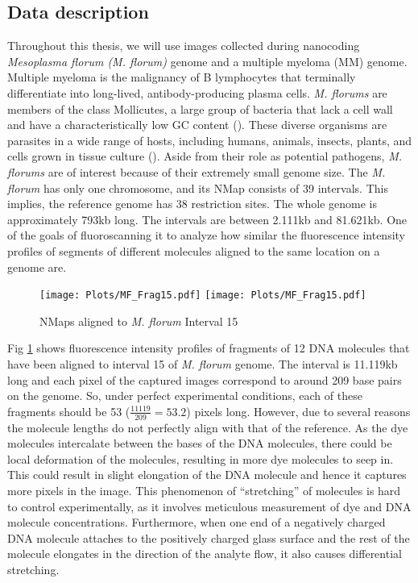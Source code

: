 \subsection{Data description} \label{Ch2_data}
Throughout this thesis, we will use images collected during nanocoding {\emph{Mesoplasma florum (M. florum)}} genome and a multiple myeloma (MM) genome. Multiple myeloma is the malignancy of B lymphocytes
that terminally differentiate into long-lived, antibody-producing plasma cells. {\emph{M. florums}} are members of the class Mollicutes, a large group of bacteria that lack a cell wall and have a characteristically low GC content (\cite{Razin_etal_1998_MMBR}). These diverse organisms are parasites in a wide range of hosts, including humans, animals, insects, plants, and cells grown in tissue culture (\cite{Razin_etal_1998_MMBR}). Aside from their role as potential pathogens, {\emph{M. florums}} are of interest because of their extremely small genome size. The {\emph{M. florum}} has only one chromosome, and its NMap consists of 39 intervals. This implies, the reference genome has 38 restriction sites. The whole genome is approximately 793kb long. The intervals are between 2.111kb and 81.621kb. One of the goals of fluoroscanning it to analyze how similar the fluorescence intensity profiles of segments of different molecules aligned to the same location on a genome are. 
\begin{figure}[H]
\begin{center}
\texttt{[image: Plots/MF\_Frag15.pdf]}
\texttt{[image: Plots/MF\_Frag15.pdf]}
\end{center}
\caption{NMaps aligned to {\emph{M. florum}} Interval 15}
\label{fig:Fig2_MF_Frag15}
\end{figure}

Fig \ref{fig:Fig2_MF_Frag15} shows fluorescence intensity profiles of fragments of 12 DNA molecules that have been aligned to interval 15 of {\emph{M. florum}} genome. The interval is 11.119kb long and each pixel of the captured images correspond to around 209 base pairs on the genome. So, under perfect experimental conditions, each of these fragments should be 53 ($\frac{11119}{209} = 53.2$) pixels long. However, due to several reasons the molecule lengths do not perfectly align with that of the reference. As the dye molecules intercalate between the bases of the DNA molecules, there could be local deformation of the molecules, resulting in more dye molecules to seep in. This could result in slight elongation of the DNA molecule and hence it captures more pixels in the image. This phenomenon of ``stretching'' of molecules is hard to control experimentally, as it involves meticulous measurement of dye and DNA molecule concentrations. Furthermore, when one end of a negatively charged DNA molecule attaches to the positively charged glass surface and the rest of the molecule elongates in the direction of the analyte flow, it also causes differential stretching. 

